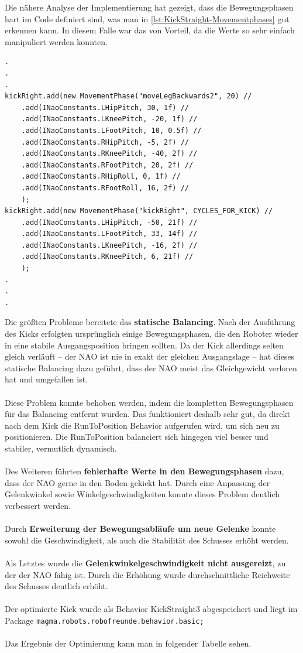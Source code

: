 \documentclass[fontsize=12pt,a4paper,final]{scrartcl}[2003/01/01]
\begin{document}
Die nähere Analyse der Implementierung hat gezeigt, dass die Bewegungsphasen hart im Code definiert sind, was man in \autoref{lst:KickStraight-Movementphases} gut erkennen kann. In diesem Falle war das von Vorteil, da die Werte so sehr einfach manipuliert werden konnten.

\begin{lstlisting}[caption=KickStraight Bewegungsphasen, captionpos=b, label=lst:KickStraight-Movementphases]
.
.
.
kickRight.add(new MovementPhase("moveLegBackwards2", 20) //
	.add(INaoConstants.LHipPitch, 30, 1f) //
	.add(INaoConstants.LKneePitch, -20, 1f) //
	.add(INaoConstants.LFootPitch, 10, 0.5f) //
	.add(INaoConstants.RHipPitch, -5, 2f) //
	.add(INaoConstants.RKneePitch, -40, 2f) //
	.add(INaoConstants.RFootPitch, 20, 2f) //
	.add(INaoConstants.RHipRoll, 0, 1f) //
	.add(INaoConstants.RFootRoll, 16, 2f) //
	);
kickRight.add(new MovementPhase("kickRight", CYCLES_FOR_KICK) //
	.add(INaoConstants.LHipPitch, -50, 21f) // 
	.add(INaoConstants.LFootPitch, 33, 14f) // 
	.add(INaoConstants.LKneePitch, -16, 2f) // 
	.add(INaoConstants.RKneePitch, 6, 21f) // 
	);
.
.
.
\end{lstlisting}

Die größten Probleme bereitete das \textbf{statische Balancing}. Nach der Ausführung des Kicks erfolgten ursprünglich einige Bewegungsphasen, die den Roboter wieder in eine stabile Ausgangsposition bringen sollten. Da der Kick allerdings selten gleich verläuft -- der NAO ist nie in exakt der gleichen Ausgangslage -- hat dieses statische Balancing dazu geführt, dass der NAO meist das Gleichgewicht verloren hat und umgefallen ist.\\
\\
Diese Problem konnte behoben werden, indem die kompletten Bewegungsphasen für das Balancing entfernt wurden. Das funktioniert deshalb sehr gut, da direkt nach dem Kick die RunToPosition Behavior aufgerufen wird, um sich neu zu positionieren. Die RunToPosition balanciert sich hingegen viel besser und stabiler, vermutlich dynamisch.\\
\\
Des Weiteren führten \textbf{fehlerhafte Werte in den Bewegungsphasen} dazu, dass der NAO gerne in den Boden gekickt hat. Durch eine Anpassung der Gelenkwinkel sowie Winkelgeschwindigkeiten konnte dieses Problem deutlich verbessert werden.\\
\\
Durch \textbf{Erweiterung der Bewegungsabläufe um neue Gelenke} konnte sowohl die Geschwindigkeit, als auch die Stabilität des Schusses erhöht werden.\\
\\
Als Letztes wurde die \textbf{Gelenkwinkelgeschwindigkeit nicht ausgereizt}, zu der der NAO fähig ist. Durch die Erhöhung wurde durchschnittliche Reichweite des Schusses deutlich erhöht.\\
\\
Der optimierte Kick wurde als Behavior KickStraight3 abgespeichert und liegt im Package \texttt{magma.robots.robofreunde.behavior.basic;}\\
\\
Das Ergebnis der Optimierung kann man in folgender Tabelle sehen.
\end{document}

